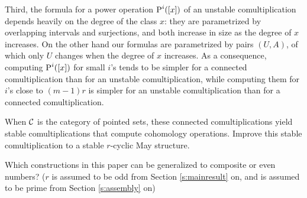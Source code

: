 Third, the formula for a power operation $\operatorname{P}^i([x])$ of an unstable comultiplication depends heavily on the degree of the class $x$: they are parametrized by overlapping intervals and surjections, and both increase in size as the degree of $x$ increases. On the other hand our formulas are parametrized by pairs $(U,A)$, of which only $U$ changes when the degree of $x$ increases. As a consequence, computing $\operatorname{P}^i([x])$ for small $i$'s tends to be simpler for a connected comultiplication than for an unstable comultiplication, while computing them for $i$'s close to $(m-1)r$ is simpler for an unstable comultiplication than for a connected comultiplication.
\begin{question}
	When $\mathcal{C}$ is the category of pointed sets, these connected comultiplications yield stable comultiplications that compute cohomology operations. Improve this stable comultiplication to a stable $r$-cyclic May structure.
\end{question}
\begin{question}
	Which constructions in this paper can be generalized to composite or even numbers? ($r$ is assumed to be odd from Section \ref{s:mainresult} on, and is assumed to be prime from Section \ref{s:assembly} on)
\end{question}



